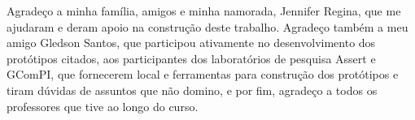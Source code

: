 \begin{agradecimentos}
Agradeço a minha família, amigos e minha namorada, Jennifer Regina, que me ajudaram e deram apoio na construção deste trabalho. Agradeço também a meu amigo Gledson Santos, que participou ativamente no desenvolvimento dos protótipos citados, aos participantes dos laboratórios de pesquisa Assert e GComPI, que fornecerem local e ferramentas para construção dos protótipos e tiram dúvidas de assuntos que não domino, e por fim, agradeço a todos os professores que tive ao longo do curso.
\end{agradecimentos}
